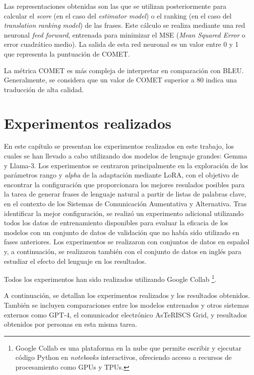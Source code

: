 \documentclass[11pt,spanish,listoffigures,listoftables]{tfgetsinf}
\begin{document}
Las representaciones obtenidas son las que se utilizan posteriormente para calcular el \textit{score} (en el caso del \textit{estimator model}) o el ranking (en el caso del \textit{translation ranking model}) de las frases. Este cálculo se realiza mediante una red neuronal \textit{feed forward}, entrenada para minimizar el MSE (\textit{Mean Squared Error} o error cuadrático medio). La salida de esta red neuronal es un valor entre 0 y 1 que representa la puntuación de COMET.

La métrica COMET es más compleja de interpretar en comparación con BLEU. Generalmente, se considera que un valor de COMET superior a 80 indica una traducción de alta calidad.

\chapter{Experimentos realizados} \label{cap4}

En este capítulo se presentan los experimentos realizados en este trabajo, los cuales se han llevado a cabo utilizando dos modelos de lenguaje grandes: Gemma y Llama-3. Los experimentos se centraron principalmente en la exploración de los parámetros rango y \textit{alpha} de la adaptación mediante LoRA, con el objetivo de encontrar la configuración que proporcionara los mejores resulados posibles para la tarea de generar frases de lenguaje natural a partir de listas de palabras clave, en el contexto de los Sistemas de Comunicación Aumentativa y Alternativa. Tras identificar la mejor configuración, se realizó un experimento adicional utilizando todos los datos de entrenamiento disponibles para evaluar la eficacia de los modelos con un conjunto de datos de validación que no había sido utilizado en fases anteriores. Los experimentos se realizaron con conjuntos de datos en español y, a continuación, se realizaron también con el conjunto de datos en inglés para estudiar el efecto del lenguaje en los resultados.

Todos los experimentos han sido realizados utilizando Google Collab \footnote{Google Collab es una plataforma  en la nube que permite escribir y ejecutar código Python en \textit{notebooks} interactivos, ofreciendo acceso a recursos de procesamiento como GPUs y TPUs.}.

A continuación, se detallan los experimentos realizados y los resultados obtenidos. También se incluyen comparaciones entre los modelos entrenados y otros sistemas externos como GPT-4, el comunicador electrónico AsTeRISCS Grid, y resultados obtenidos por personas en esta misma tarea.
\end{document}
